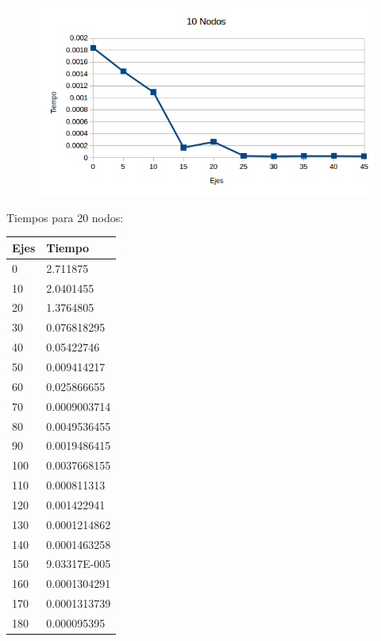  \begin{figure}[h!]
   \begin{center}
 	\includegraphics[scale=0.7]{imagenes/exacto/10Nodos.png}
   \end{center}
 \end{figure}

 Tiempos para 20 nodos: \\
 \begin{tabular}{| l | l |}
 \hline
  Ejes & Tiempo \\ \hline
  0 & 2.711875 \\ \hline
  10 & 2.0401455 \\ \hline
  20 & 1.3764805 \\ \hline
  30 & 0.076818295 \\ \hline
  40 & 0.05422746 \\ \hline
  50 & 0.009414217 \\ \hline
  60 & 0.025866655 \\ \hline
  70 & 0.0009003714 \\ \hline
  80 & 0.0049536455 \\ \hline
  90 & 0.0019486415 \\ \hline
  100 & 0.0037668155 \\ \hline
  110 & 0.000811313 \\ \hline
  120 & 0.001422941 \\ \hline
  130 & 0.0001214862 \\ \hline
  140 & 0.0001463258 \\ \hline
  150 & 9.03317E-005 \\ \hline
  160 & 0.0001304291 \\ \hline
  170 & 0.0001313739 \\ \hline
  180 & 0.000095395 \\ \hline
 \end{tabular}

